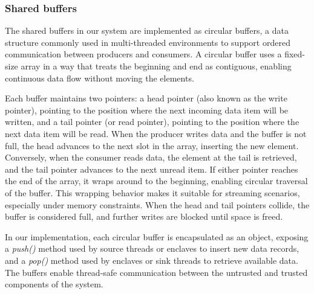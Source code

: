 
\subsubsection*{Shared buffers}
The shared buffers in our system are implemented as circular buffers, a data structure commonly used in multi-threaded
environments to support ordered communication between producers and consumers. A circular buffer uses a fixed-size array
in a way that treats the beginning and end as contiguous, enabling continuous data flow without moving the elements.


Each buffer maintains two pointers: a head pointer (also known as the write pointer), pointing to the position where
the next incoming data item will be written, and a tail pointer (or read pointer), pointing to the position where the
next data item will be read. When the producer writes data and the buffer is not full, the head advances to the next
slot in the array, inserting the new element. Conversely, when the consumer reads data, the element at the tail is
retrieved, and the tail pointer advances to the next unread item. If either pointer reaches the end of the array, it
wraps around to the beginning, enabling circular traversal of the buffer. This wrapping behavior makes it suitable for
streaming scenarios, especially under memory constraints. When the head and tail pointers collide, the buffer is
considered full, and further writes are blocked until space is freed.

In our implementation, each circular buffer is encapsulated as an object, exposing a \textit{push()} method used by source threads or enclaves to insert new data records, and a \textit{pop()} method used by enclaves or sink threads to retrieve available data.
The buffers enable thread-safe communication between the untrusted and trusted components of the system.

